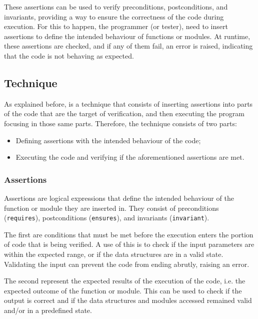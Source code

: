 These assertions can be used to verify preconditions, postconditions, and invariants, 
providing a way to ensure the correctness of the code during execution. For this to 
happen, the programmer (or tester), need to insert assertions to define the intended 
behaviour of functions or modules. At runtime, these assertions are checked, and if 
any of them fail, an error is raised, indicating that the code is not behaving as 
expected.

\subsection{Technique}
\label{sub:technique}

As explained before, \rac is a technique that consists of inserting assertions into 
parts of the code that are the target of verification, and then executing the program 
focusing in those same parts. Therefore, the technique consists of two parts:

\begin{itemize}
    \item Defining assertions with the intended behaviour of the code;
    \item Executing the code and verifying if the aforementioned assertions are met.
\end{itemize}

\subsubsection{Assertions}
\label{subsub:assertions}

Assertions are logical expressions that define the intended behaviour of the 
function or module they are inserted in. They consist of preconditions (\texttt{requires}), 
postconditions (\texttt{ensures}), and invariants (\texttt{invariant}).

The first are conditions that must be met before the execution enters 
the portion of code that is being verified. A use of this is to check if the input 
parameters are within the expected range, or if the data structures are in a valid 
state. Validating the input can prevent the code from ending abrutly, raising an error.

The second represent the expected results of the execution of the code, i.e. the expected 
outcome of the function or module. This can be used to check if the output is correct and 
if the data structures and modules accessed remained valid and/or in a predefined state. 

